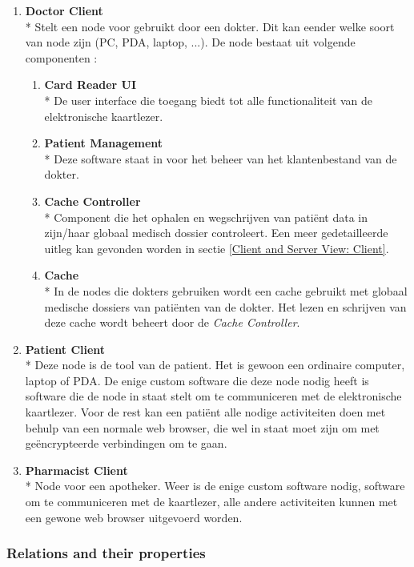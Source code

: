 \documentclass[a4paper,10pt]{article}
\begin{document}
\begin{enumerate}
\item \textbf{Doctor Client}\\*
Stelt een node voor gebruikt door een dokter. Dit kan eender welke soort van node zijn (PC, PDA, laptop, ...). De node bestaat uit volgende componenten : 
\begin{enumerate}
 \item \textbf{Card Reader UI}\\*
De user interface die toegang biedt tot alle functionaliteit van de elektronische kaartlezer.
\item \textbf{Patient Management}\\*
Deze software staat in voor het beheer van het klantenbestand van de dokter.
\item \textbf{Cache Controller}\\*
Component die het ophalen en wegschrijven van patiënt data in zijn/haar globaal medisch dossier controleert. Een meer gedetailleerde uitleg kan gevonden worden in sectie \ref{Client and Server View: Client}.
\item \textbf{Cache}\\*
In de nodes die dokters gebruiken wordt een cache gebruikt met globaal medische dossiers van patiënten van de dokter. Het lezen en schrijven van deze cache wordt beheert door de \textit{Cache Controller}.
\end{enumerate}

\item \textbf{Patient Client}\\*
Deze node is de tool van de patient. Het is gewoon een ordinaire computer, laptop of PDA. De enige custom software die deze node nodig heeft is software die de node in staat stelt om te communiceren met de elektronische kaartlezer. Voor de rest kan een patiënt alle nodige activiteiten doen met behulp van een normale web browser, die wel in staat moet zijn om met geëncrypteerde verbindingen om te gaan.

\item \textbf{Pharmacist Client}\\*
Node voor een apotheker. Weer is de enige custom software nodig, software om te communiceren met de kaartlezer, alle andere activiteiten kunnen met een gewone web browser uitgevoerd worden.

\end{enumerate}


\subsubsection{Relations and their properties}
\end{document}
